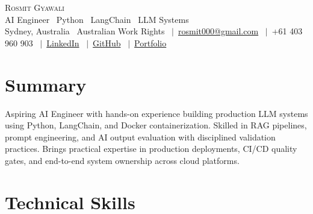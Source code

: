 \documentclass[a4paper,11pt]{article}
\begin{document}

\begin{center}
    {\LARGE \scshape Rosmit Gyawali} \\ \vspace{2pt}
    \small
    AI Engineer \textbullet\ Python \textbullet\ LangChain \textbullet\ LLM Systems
    \\ \vspace{3pt}
    Sydney, Australia \textbullet\ Australian Work Rights
    \ $|$\ \href{mailto:rosmit000@gmail.com}{rosmit000@gmail.com}
    \ $|$\ +61 403 960 903
    \ $|$\ \href{https://linkedin.com/in/rosmitg}{LinkedIn}
    \ $|$\ \href{https://github.com/rosmitg}{GitHub}
    \ $|$\ \href{https://rosmit.com.au}{Portfolio}
\end{center}

\vspace{-9pt}


\section{Summary}

\small{
Aspiring AI Engineer with hands-on experience building production LLM systems using Python, LangChain, and
Docker containerization. Skilled in RAG pipelines, prompt engineering, and AI output evaluation with disciplined
validation practices. Brings practical expertise in production deployments, CI/CD quality gates, and end-to-end
system ownership across cloud platforms.
}

\vspace{-2pt}


\section{Technical Skills}
\end{document}
